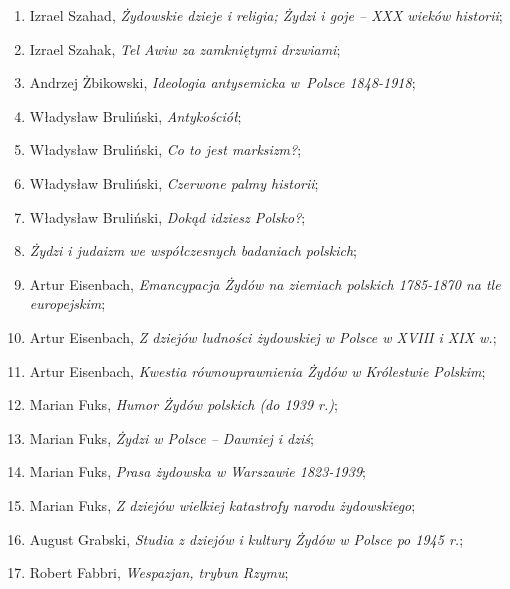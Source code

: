 \documentclass[a4paper,11pt]{article}
\begin{document}
\begin{enumerate}
\item Izrael Szahad, \textit{Żydowskie dzieje i religia; Żydzi i goje –
    XXX wieków historii};

\item Izrael Szahak, \textit{Tel Awiw za zamkniętymi drzwiami};

\item Andrzej Żbikowski, \textit{Ideologia antysemicka w~Polsce
    1848-1918};

\item Władysław Bruliński, \textit{Antykościół};

\item Władysław Bruliński, \textit{Co to jest marksizm?};

\item Władysław Bruliński, \textit{Czerwone palmy historii};

\item Władysław Bruliński, \textit{Dokąd idziesz Polsko?};

\item \textit{Żydzi i judaizm we współczesnych badaniach polskich};

\item Artur Eisenbach, \textit{Emancypacja Żydów na ziemiach polskich
    1785-1870 na tle europejskim};

\item Artur Eisenbach, \textit{Z dziejów ludności żydowskiej w Polsce w
    XVIII i XIX w.};

\item Artur Eisenbach, \textit{Kwestia równouprawnienia Żydów w
    Królestwie Polskim};

\item Marian Fuks, \textit{Humor Żydów polskich (do 1939 r.)};

\item Marian Fuks, \textit{Żydzi w Polsce – Dawniej i dziś};

\item Marian Fuks, \textit{Prasa żydowska w Warszawie 1823-1939};

\item Marian Fuks, \textit{Z dziejów wielkiej katastrofy narodu
    żydowskiego};

\item August Grabski, \textit{Studia z dziejów i kultury Żydów w Polsce
    po 1945 r.};

\item Robert Fabbri, \textit{Wespazjan, trybun Rzymu};


\end{enumerate}
\end{document}

